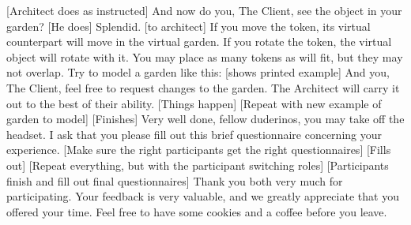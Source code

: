		[Architect does as instructed]
		And now do you, The Client, see the object in your garden?
		[He does]
		Splendid. [to architect] If you move the token, its virtual counterpart will move in the virtual garden. If you rotate the token, the virtual object will rotate with it. You may place as many tokens as will fit, but they may not overlap. 
		Try to model a garden like this:
		[shows printed example]
		And you, The Client, feel free to request changes to the garden. The Architect will carry it out to the best of their ability. 
		[Things happen]
		[Repeat with new example of garden to model]
		[Finishes]
		Very well done, fellow duderinos, you may take off the headset. I ask that you please fill out this brief questionnaire concerning your experience. 
		[Make sure the right participants get the right questionnaires]
		[Fills out]
		[Repeat everything, but with the participant switching roles]
		[Participants finish and fill out final questionnaires]
		Thank you both very much for participating. Your feedback is very valuable, and we greatly appreciate that you offered your time. Feel free to have some cookies and a coffee before you leave.

\newpage
